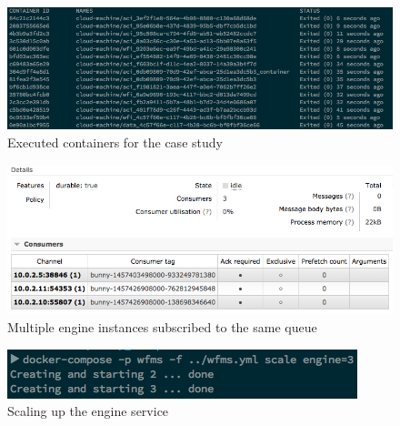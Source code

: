   \begin{figure}[htbp]
    \centering
    \includegraphics[width=\textwidth]{./content/images/usecase/case_study_25.png}
    \caption{Executed containers for the case study}
    \label{fig:exe_containers}
  \end{figure}

  \begin{figure}[htbp]
    \centering
    \includegraphics[width=\textwidth]{./content/images/usecase/case_study_27.png}
    \caption{Multiple engine instances subscribed to the same queue}
    \label{fig:mult_engines}
  \end{figure}

  \begin{figure}[htbp]
    \centering
    \includegraphics[width=\textwidth]{./content/images/usecase/case_study_28.png}
    \caption{Scaling up the engine service}
    \label{fig:mult_engines_2}
  \end{figure}

